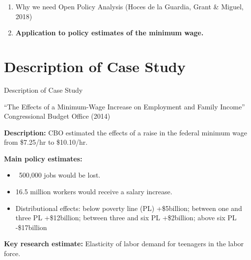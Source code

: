 \documentclass{beamer}
\begin{document}


\begin{frame}[noframenumbering]
\begin{enumerate}
\item Why we need Open Policy Analysis (Hoces de la Guardia, Grant \& Miguel, 2018)
\bigskip
\item \textbf{Application to policy estimates of the minimum wage. }
\end{enumerate}
\end{frame}


\section[Case Study]{Description of Case Study}

\begin{frame}[label =  desc_cs]{Description of Case Study}
\begin{center}
``The Effects of a Minimum-Wage Increase on Employment and Family Income'' 
Congressional Budget Office (2014)
\end{center}

\textbf{Description:} CBO estimated the effects of a raise in the federal minimum wage from \$7.25/hr to \$10.10/hr. 


\textbf{Main policy estimates:}
\begin{itemize}
\item ~500,000 jobs would be lost.
\item 16.5 million workers would receive a salary increase. 
\item Distributional effects: below poverty line (PL) +\$5billion; between one and three PL +\$12billion; between three and six PL +\$2billion; above six PL -\$17billion
\end{itemize}

\textbf{Key research estimate:} Elasticity of labor demand for teenagers in the labor force. 
\end{frame}
\end{document}
